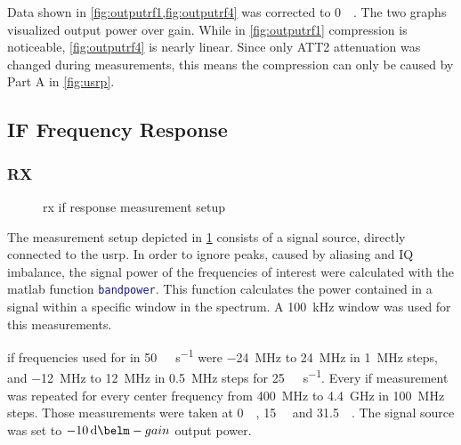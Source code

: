 \documentclass[12pt,a4paper,parskip=full,abstracton]{scrartcl}
\begin{document}
Data shown in \cref{fig:outputrf1,fig:outputrf4} was corrected to \SI{0}{\deci\belfs}. The
two graphs visualized output power over gain. While in \cref{fig:outputrf1} compression
is noticeable, \cref{fig:outputrf4} is nearly linear. Since only ATT2 attenuation was
changed during measurements, this means the compression can only be caused by Part A
in \cref{fig:usrp}.


\subsection{IF Frequency Response}
\subsubsection{RX}
\label{sec:ifrx}
\begin{figure}[htb]
    \centering
    \caption{\gls{rx} \gls{if} response measurement setup}
    \label{fig:rxifsetup}
\end{figure}

The measurement setup depicted in \cref{fig:rxifsetup} consists of a signal source, directly
connected to the \gls{usrp}. In order to ignore peaks, caused by aliasing and IQ imbalance,
the signal power of the frequencies of interest were calculated with the matlab function
\lstinline[language=matlab]{bandpower}. This function calculates the power contained in
a signal within a specific window in the spectrum. A \SI{100}{\kilo\hertz} window was
used for this measurements.

\gls{if} frequencies used for in \SI{50}{\mega\samples\per\second} were \SI{-24}{\mega\hertz}
to \SI{24}{\mega\hertz} in \SI{1}{\mega\hertz} steps, and \SI{-12}{\mega\hertz}
to \SI{12}{\mega\hertz} in \SI{0.5}{\mega\hertz} steps for \SI{25}{\mega\samples\per\second}.
Every \gls{if} measurement was repeated for every center frequency from \SI{400}{\mega\hertz}
to \SI{4.4}{\giga\hertz} in \SI{100}{\mega\hertz} steps. Those measurements were taken
at \SI{0}{\deci\belm}, \SI{15}{\deci\belm} and \SI{31.5}{\deci\belm}. The signal source was
set to $\SI{-10}{\deci\belm}-gain$ output power.
\end{document}
